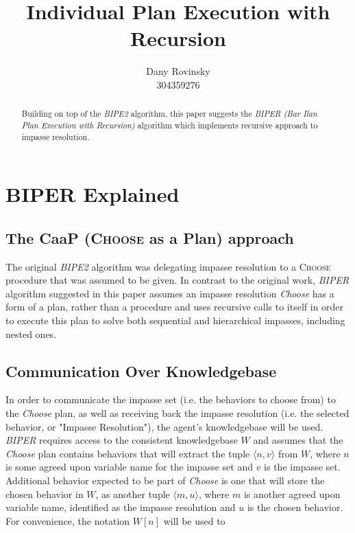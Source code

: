 \documentclass[3p,times]{elsarticle} %
\newcommand{\tuple}[2]{$\langle #1, #2\rangle$}
\newcommand{\noun}[1]{\textsc{#1}}
\begin{document}
\begin{frontmatter}
\title{Individual Plan Execution with Recursion}
\author{Dany Rovinsky\\304359276}
\address{Computer Science Department\\
Bar Ilan University, Israel}

\begin{abstract}
Building on top of the \textit{BIPE2} algorithm, this paper suggests the \textit{BIPER (Bar Ilan Plan Execution with Recursion)} algorithm which implements recursive approach to impasse resolution.
\end{abstract}

\end{frontmatter}

\section{BIPER Explained}

\subsection{The CaaP (\noun{Choose} as a Plan) approach}

The original \textit{BIPE2} algorithm was delegating impasse resolution to a \noun{Choose} procedure that was assumed to be given. In contrast to the original work, \textit{BIPER} algorithm suggested in this paper assumes an impasse resolution \textit{Choose} has a form of a plan, rather than a procedure and uses recursive calls to itself in order to execute this plan to solve both sequential and hierarchical impasses, including nested ones.

\subsection{Communication Over  Knowledgebase}

In order to communicate the impasse set (i.e. the behaviors to choose from) to the \textit{Choose} plan, as well as receiving back the impasse resolution (i.e. the selected behavior, or "Impasse Resolution"), the agent's knowledgebase will be used. \textit{BIPER} requires access to the consistent knowledgebase $W$ and assumes that the \textit{Choose} plan contains behaviors that will extract the tuple \tuple{n}{v} from $W$, where $n$ is some agreed upon variable name for the impasse set and $v$ is the impasse set. Additional behavior expected to be part of \textit{Choose} is one that will store the chosen behavior in $W$, as another tuple \tuple{m}{u}, where $m$ is another agreed upon variable name, identified as the impasse resolution and $u$ is the chosen behavior. For convenience, the notation $W[n]$ will be used to 
\end{document}
